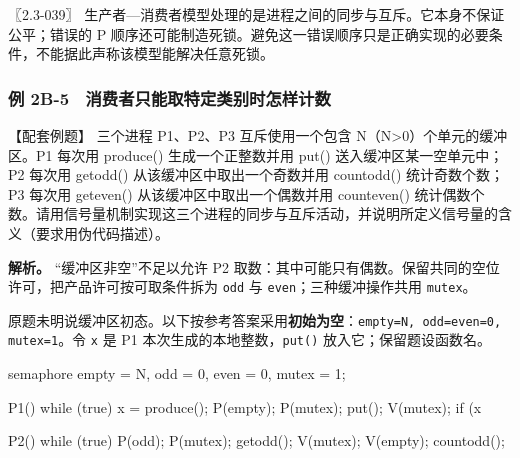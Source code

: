 〖2.3-039〗 生产者---消费者模型处理的是进程之间的同步与互斥。它本身不保证公平；错误的 P 顺序还可能制造死锁。避免这一错误顺序只是正确实现的必要条件，不能据此声称该模型能解决任意死锁。

\subsubsection{例 2B-5　消费者只能取特定类别时怎样计数}\label{OS02-ex-2009}

\begin{example}[配套例题]

【配套例题】 三个进程 P1、P2、P3 互斥使用一个包含 N（N\textgreater0）个单元的缓冲区。P1 每次用 produce() 生成一个正整数并用 put() 送入缓冲区某一空单元中；P2 每次用 getodd() 从该缓冲区中取出一个奇数并用 countodd() 统计奇数个数；P3 每次用 geteven() 从该缓冲区中取出一个偶数并用 counteven() 统计偶数个数。请用信号量机制实现这三个进程的同步与互斥活动，并说明所定义信号量的含义（要求用伪代码描述）。

\end{example}

\textbf{解析。} ``缓冲区非空''不足以允许 P2 取数：其中可能只有偶数。保留共同的空位许可，把产品许可按可取条件拆为 \texttt{odd} 与 \texttt{even}；三种缓冲操作共用 \texttt{mutex}。

原题未明说缓冲区初态。以下按参考答案采用\textbf{初始为空}：\texttt{empty=\allowbreak{}N,\allowbreak{} odd=\allowbreak{}even=\allowbreak{}0,\allowbreak{} mutex=\allowbreak{}1}。令 \texttt{x} 是 P1 本次生成的本地整数，\texttt{put(\allowbreak{})\allowbreak{}} 放入它；保留题设函数名。

\par\medskip\noindent\begin{minipage}{\linewidth}
\begin{codeblock}[language={}]
semaphore empty = N, odd = 0, even = 0, mutex = 1;

P1() {
    while (true) {
        x = produce();
        P(empty);
        P(mutex);
        put();
        V(mutex);
        if (x %
    }
}
\end{codeblock}
\end{minipage}\par\medskip

\par\medskip\noindent\begin{minipage}{\linewidth}
\begin{codeblock}[language={}]
P2() {
    while (true) {
        P(odd);
        P(mutex);
        getodd();
        V(mutex);
        V(empty);
        countodd();
    }
}
\end{codeblock}
\end{minipage}\par\medskip

